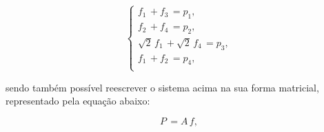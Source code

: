 \begin{equation}
\begin{cases}
f_{1} \, + f_{3} \, = p_{1}, \\ 
f_{2} \, + f_{4} \, = p_{2}, \\ 
\sqrt{2} \, f_{1} \, + \sqrt{2} \, f_{4} \, = p_{3}, \\ 
f_{1} \, + f_{2} \, = p_{4}, \\ 
\end{cases}
\label{eq:eqCap3EquacoesLineares}
\end{equation} 

\noindent sendo também possível reescrever o sistema acima na sua forma matricial, representado pela equação abaixo:

\begin{equation}
P \, = A \, f,
\label{eq:eqCap3MatrizEquacoesLineares1}
\end{equation}

